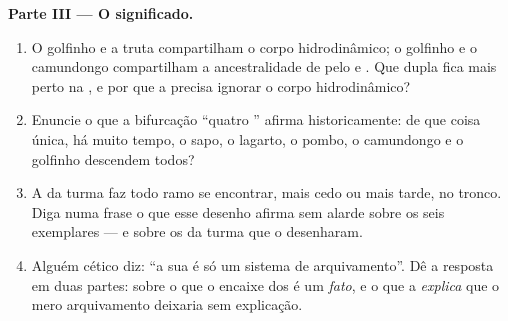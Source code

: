 \begin{problem}
\medskip\noindent\textbf{Parte III --- O significado.}
\begin{enumerate}[resume]
  \item O golfinho e a truta compartilham o corpo hidrodinâmico; o
        golfinho e o camundongo compartilham a ancestralidade de pelo
        e . Que dupla fica mais perto na , e por que a
         precisa ignorar o corpo hidrodinâmico?
  \item Enuncie o que a bifurcação ``quatro '' afirma
        historicamente: de que coisa única, há muito tempo, o sapo, o
        lagarto, o pombo, o camundongo e o golfinho descendem todos?
  \item A  da turma faz todo ramo se encontrar, mais cedo ou
        mais tarde, no tronco. Diga numa frase o que esse desenho
        afirma sem alarde sobre os seis exemplares --- e sobre os
         da turma que o desenharam.
  \item Alguém cético diz: ``a sua  é só um sistema de
        arquivamento''. Dê a resposta em duas partes: sobre o que o
        encaixe dos  é um \emph{fato}, e o que a 
        \emph{explica} que o mero arquivamento deixaria sem
        explicação.
\end{enumerate}
\end{problem}
